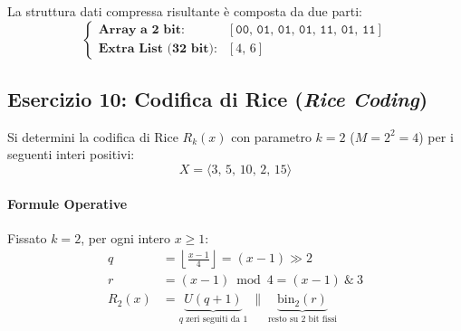 La struttura dati compressa risultante \`e composta da due parti:
\begin{equation}
  \begin{cases}
    \textbf{Array a 2 bit:} & [\texttt{00}, \, \texttt{01}, \, \texttt{01}, \, \texttt{01}, \, \texttt{11}, \, \texttt{01}, \, \texttt{11}] \\
    \textbf{Extra List (32 bit):} & [4, \, 6]
  \end{cases}
\end{equation}

\FloatBarrier
\subsection{Esercizio 10: Codifica di Rice (\textit{Rice Coding})}
\label{subsec:es10-rice-coding}

\begin{example}[Codifica di Rice con Parametro $k = 2$]
Si determini la codifica di Rice $R_k(x)$ con parametro $k = 2$ ($M = 2^2 = 4$) per i seguenti interi positivi:
\begin{equation}
  X = \langle 3, \, 5, \, 10, \, 2, \, 15 \rangle
\end{equation}
\end{example}

\paragraph{Formule Operative}
Fissato $k = 2$, per ogni intero $x \ge 1$:
\begin{align}
  q &= \left\lfloor \frac{x - 1}{4} \right\rfloor = (x - 1) \gg 2 \\
  r &= (x - 1) \bmod 4 = (x - 1) \ \& \ 3 \\
  R_2(x) &= \underbrace{U(q + 1)}_{q \text{ zeri seguiti da } 1} \;\|\; \underbrace{\text{bin}_2(r)}_{\text{resto su 2 bit fissi}}
\end{align}

